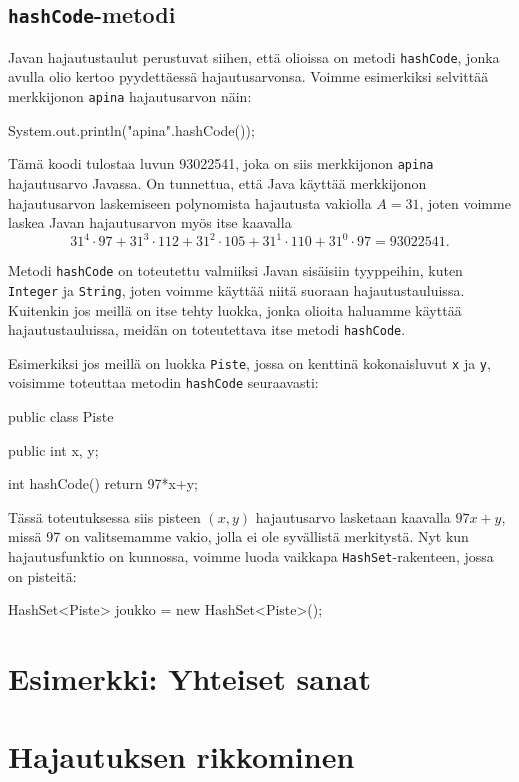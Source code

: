 \subsection{\texttt{hashCode}-metodi}

Javan hajautustaulut perustuvat siihen, että olioissa
on metodi \texttt{hashCode}, jonka avulla olio kertoo
pyydettäessä hajautusarvonsa.
Voimme esimerkiksi selvittää merkkijonon \texttt{apina}
hajautusarvon näin:

\begin{code}
System.out.println("apina".hashCode());
\end{code}

Tämä koodi tulostaa luvun 93022541,
joka on siis merkkijonon \texttt{apina} hajautusarvo Javassa.
On tunnettua, että Java käyttää merkkijonon hajautusarvon laskemiseen
polynomista hajautusta vakiolla $A=31$,
joten voimme laskea Javan hajautusarvon myös itse kaavalla
\[31^4 \cdot 97+31^3 \cdot 112+31^2 \cdot 105+31^1 \cdot 110+31^0 \cdot 97=93022541.\]

Metodi \texttt{hashCode} on toteutettu valmiiksi Javan
sisäisiin tyyppeihin, kuten \texttt{Integer} ja \texttt{String},
joten voimme käyttää niitä suoraan hajautustauluissa.
Kuitenkin jos meillä on itse tehty luokka, jonka olioita
haluamme käyttää hajautustauluissa, meidän on toteutettava
itse metodi \texttt{hashCode}.

Esimerkiksi jos meillä on luokka \texttt{Piste},
jossa on kenttinä kokonaisluvut \texttt{x} ja \texttt{y},
voisimme toteuttaa metodin \texttt{hashCode} seuraavasti:

\begin{code}
public class Piste {
    public int x, y;

    int hashCode() {
        return 97*x+y;
    }
}
\end{code}

Tässä toteutuksessa siis pisteen $(x,y)$ hajautusarvo lasketaan
kaavalla $97x+y$, missä 97 on valitsemamme vakio, jolla ei ole
syvällistä merkitystä.
Nyt kun hajautusfunktio on kunnossa,
voimme luoda vaikkapa \texttt{HashSet}-rakenteen, jossa on pisteitä:

\begin{code}
HashSet<Piste> joukko = new HashSet<Piste>();
\end{code}

\section{Esimerkki: Yhteiset sanat}

\section{Hajautuksen rikkominen}
